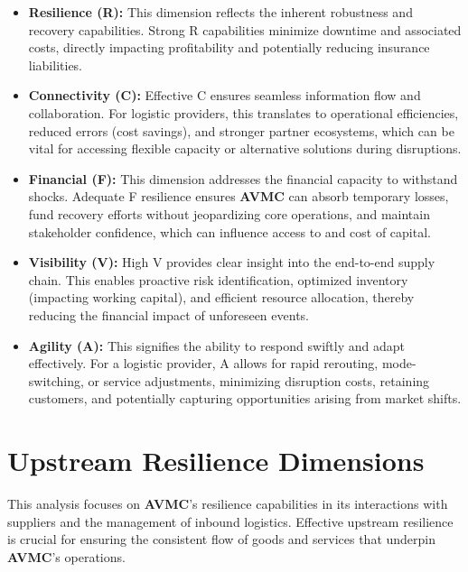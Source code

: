 \documentclass[
  oneside,
  open=any,
  fontsize=11pt]{scrbook}
\providecommand{\tightlist}{%
  \setlength{\itemsep}{0pt}\setlength{\parskip}{0pt}}
\begin{document}
\begin{itemize}
\tightlist
\item
  \textbf{Resilience (R):} This dimension reflects the inherent
  robustness and recovery capabilities. Strong R capabilities minimize
  downtime and associated costs, directly impacting profitability and
  potentially reducing insurance liabilities.
\item
  \textbf{Connectivity (C):} Effective C ensures seamless information
  flow and collaboration. For logistic providers, this translates to
  operational efficiencies, reduced errors (cost savings), and stronger
  partner ecosystems, which can be vital for accessing flexible capacity
  or alternative solutions during disruptions.
\item
  \textbf{Financial (F):} This dimension addresses the financial
  capacity to withstand shocks. Adequate F resilience ensures
  \textbf{AVMC} can absorb temporary losses, fund recovery efforts
  without jeopardizing core operations, and maintain stakeholder
  confidence, which can influence access to and cost of capital.
\item
  \textbf{Visibility (V):} High V provides clear insight into the
  end-to-end supply chain. This enables proactive risk identification,
  optimized inventory (impacting working capital), and efficient
  resource allocation, thereby reducing the financial impact of
  unforeseen events.
\item
  \textbf{Agility (A):} This signifies the ability to respond swiftly
  and adapt effectively. For a logistic provider, A allows for rapid
  rerouting, mode-switching, or service adjustments, minimizing
  disruption costs, retaining customers, and potentially capturing
  opportunities arising from market shifts.
\end{itemize}

\section{Upstream Resilience
Dimensions}\label{upstream-resilience-dimensions}

This analysis focuses on \textbf{AVMC}'s resilience capabilities in its
interactions with suppliers and the management of inbound logistics.
Effective upstream resilience is crucial for ensuring the consistent
flow of goods and services that underpin \textbf{AVMC}'s operations.
\end{document}
